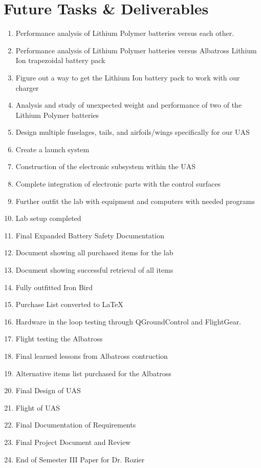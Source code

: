 ﻿\documentclass{article}
\begin{document}
\section{Future Tasks \& Deliverables}
\begin{enumerate}
\item Performance analysis of Lithium Polymer batteries versus each other.
\item Performance analysis of Lithium Polymer batteries versus Albatross Lithium Ion trapezoidal battery pack
\item Figure out a way to get the Lithium Ion battery pack to work with our charger
\item Analysis and study of unexpected weight and performance of two of the Lithium Polymer batteries
\item Design multiple fuselages, tails, and airfoils/wings specifically for our UAS
\item Create a launch system
\item Construction of the electronic subsystem within the UAS
\item Complete integration of electronic parts with the control surfaces
\item Further outfit the lab with equipment and computers with needed programs
\item Lab setup completed
\item Final Expanded Battery Safety Documentation
\item Document showing all purchased items for the lab 
\item Document showing successful retrieval of all items 
\item Fully outfitted Iron Bird 
\item Purchase List converted to LaTeX
\item Hardware in the loop testing through QGroundControl and FlightGear. 
\item Flight testing the Albatross
\item Final learned lessons from Albatross contruction
\item Alternative items list purchased for the Albatross
\item Final Design of UAS
\item Flight of UAS
\item Final Documentation of Requirements
\item Final Project Document and Review
\item End of Semester III Paper for Dr. Rozier
\end{enumerate}
\end{document}
